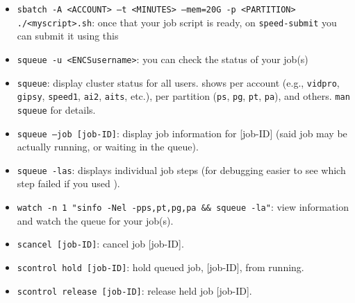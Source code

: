 \begin{itemize}
\item
\texttt{sbatch -A <ACCOUNT> --t <MINUTES> --mem=20G -p <PARTITION> ./<myscript>.sh}: once that your job script is ready,
on \texttt{speed-submit} you can submit it using this

\item
\texttt{squeue -u <ENCSusername>}: you can check the status of your job(s)

\item
\texttt{squeue}: display cluster status for all users. 
 shows per account (e.g., \texttt{vidpro}, \texttt{gipsy},
\texttt{speed1}, \texttt{ai2}, \texttt{aits}, etc.),
 per partition (\texttt{ps}, \texttt{pg}, \texttt{pt}, \texttt{pa}),
and others. \texttt{man squeue} for details.

\item
\texttt{squeue --job [job-ID]}: display job information for [job-ID] (said job may be actually running, or waiting in the queue). 

\item
\texttt{squeue -las}: displays individual job steps (for debugging
easier to see which step failed if you used ).

\item
\verb+watch -n 1 "sinfo -Nel -pps,pt,pg,pa && squeue -la"+: view  information and watch the queue for your job(s).

\item
\texttt{scancel [job-ID]}: cancel job [job-ID]. 

\item
\texttt{scontrol hold [job-ID]}: hold queued job, [job-ID], from running. 

\item
\texttt{scontrol release [job-ID]}: release held job [job-ID]. 


\end{itemize}
